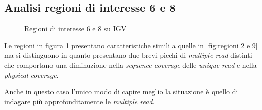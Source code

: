 \subsection{Analisi regioni di interesse 6 e 8}
\begin{figure}[htbp]
\centering
{} \quad
{}
\caption{Regioni di interesse 6 e 8 su IGV}
\label{fig:regioni 6 e 8}
\end{figure}

Le regioni in figura \ref{fig:regioni 6 e 8} presentano caratteristiche simili a quelle in \ref{fig:regioni 2 e 9} ma si distinguono in quanto presentano due brevi picchi di \emph{multiple read} distinti che comportano una diminuzione nella \emph{sequence coverage} delle \emph{unique read} e nella \emph{physical coverage}.

Anche in questo caso l'unico modo di capire meglio la situazione è quello di indagare più approfonditamente le \emph{multiple read}.

